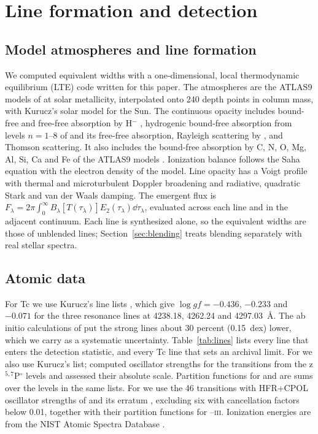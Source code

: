 \documentclass[final,5p]{elsarticle}
\begin{document}
\section{Line formation and detection}
\label{sec:methods}

\subsection{Model atmospheres and line formation}
\label{sec:synthesis}

We computed equivalent widths with a one-dimensional, local thermodynamic equilibrium (LTE) code written for this paper. The atmospheres are the ATLAS9 models of \citet{CastelliKurucz2003} at solar metallicity, interpolated onto 240 depth points in column mass, with Kurucz's solar model for the Sun. The continuous opacity includes bound-free and free-free absorption by H$^-$ \citep{John1988}, hydrogenic bound-free absorption from levels $n=1$--8 of  and its free-free absorption, Rayleigh scattering by , and Thomson scattering. It also includes the bound-free absorption by C, N, O, Mg, Al, Si, Ca and Fe of the ATLAS9 models \citep{CastelliKurucz2003}. Ionization balance follows the Saha equation with the electron density of the model. Line opacity has a Voigt profile with thermal and microturbulent Doppler broadening and radiative, quadratic Stark and van der Waals damping. The emergent flux is $F_\lambda = 2\pi \int_0^\infty B_\lambda[T(\tau_\lambda)] E_2(\tau_\lambda) \dd\tau_\lambda$, evaluated across each line and in the adjacent continuum. Each line is synthesized alone, so the equivalent widths are those of unblended lines; Section~\ref{sec:blending} treats blending separately with real stellar spectra.

\subsection{Atomic data}
\label{sec:atomic}

For Tc we use Kurucz's line lists \citep{Kurucz2011}, which give $\log gf = -0.436$, $-0.233$ and $-0.071$ for the three  resonance lines at 4238.18, 4262.24 and 4297.03~\AA. The ab initio calculations of \citet{Palmeri2005} put the strong  lines about 30 percent (0.15~dex) lower, which we carry as a systematic uncertainty. Table~\ref{tab:lines} lists every line that enters the detection statistic, and every Tc line that sets an archival limit. For  we also use Kurucz's list; \citet{Palmeri2007} computed oscillator strengths for the  transitions from the z$^{5,7}$P$^\circ$ levels and assessed their absolute scale. Partition functions for  and  are sums over the levels in the same lists. For  we use the 46 transitions with HFR+CPOL oscillator strengths of \citet{Fivet2007} and its erratum \citep{Fivet2007erratum}, excluding six with cancellation factors below 0.01, together with their partition functions for --\textsc{iii}. Ionization energies are from the NIST Atomic Spectra Database \citep{NIST2024}.
\end{document}
